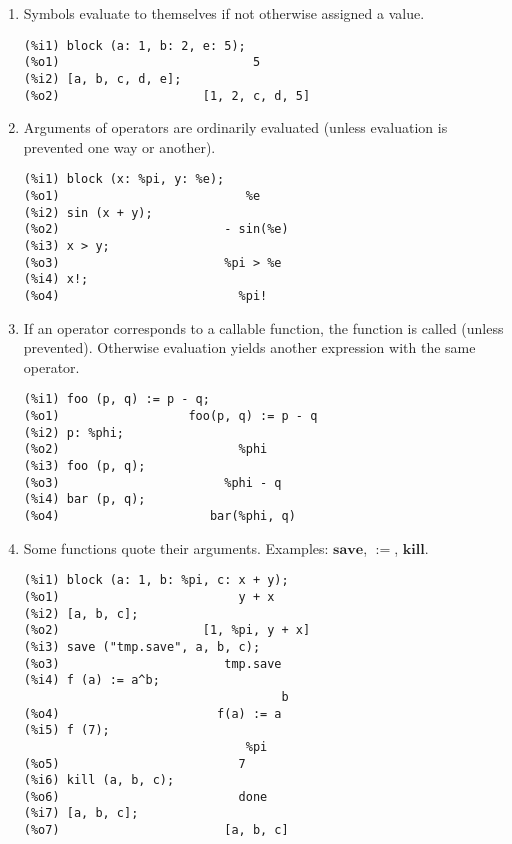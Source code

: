 \documentclass[12pt]{article}
\begin{document}
\begin{enumerate}

\item Symbols evaluate to themselves if not otherwise assigned a value.

\begin{verbatim}
(%i1) block (a: 1, b: 2, e: 5);
(%o1)                           5
(%i2) [a, b, c, d, e];
(%o2)                    [1, 2, c, d, 5]
\end{verbatim}

\item Arguments of operators are ordinarily evaluated (unless evaluation is prevented one way or another).

\begin{verbatim}
(%i1) block (x: %pi, y: %e);
(%o1)                          %e
(%i2) sin (x + y);
(%o2)                       - sin(%e)
(%i3) x > y; 
(%o3)                       %pi > %e
(%i4) x!;
(%o4)                         %pi!
\end{verbatim}

\item If an operator corresponds to a callable function,
the function is called (unless prevented).
Otherwise evaluation yields another expression with the same operator.

\begin{verbatim}
(%i1) foo (p, q) := p - q;
(%o1)                  foo(p, q) := p - q
(%i2) p: %phi;
(%o2)                         %phi
(%i3) foo (p, q);
(%o3)                       %phi - q
(%i4) bar (p, q);
(%o4)                     bar(%phi, q)
\end{verbatim}

\item Some functions quote their arguments.
Examples: $\mathbf{save}$, $\mathbf{:=}$, $\mathbf{kill}$.

\begin{verbatim}
(%i1) block (a: 1, b: %pi, c: x + y);
(%o1)                         y + x
(%i2) [a, b, c];
(%o2)                    [1, %pi, y + x]
(%i3) save ("tmp.save", a, b, c);
(%o3)                       tmp.save
(%i4) f (a) := a^b;
                                    b
(%o4)                      f(a) := a
(%i5) f (7);
                               %pi
(%o5)                         7
(%i6) kill (a, b, c);
(%o6)                         done
(%i7) [a, b, c];
(%o7)                       [a, b, c]
\end{verbatim}


\end{enumerate}
\end{document}
